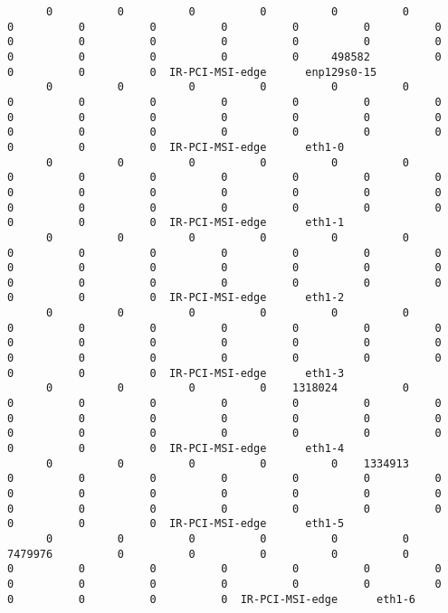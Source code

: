 \begin{lstlisting}
      0          0          0          0          0          0          0          0          0          0          0          0          0          0          0          0          0          0          0          0          0          0          0          0          0     498582          0          0          0          0  IR-PCI-MSI-edge      enp129s0-15
      0          0          0          0          0          0          0          0          0          0          0          0          0          0          0          0          0          0          0          0          0          0          0          0          0          0          0          0          0          0  IR-PCI-MSI-edge      eth1-0
      0          0          0          0          0          0          0          0          0          0          0          0          0          0          0          0          0          0          0          0          0          0          0          0          0          0          0          0          0          0  IR-PCI-MSI-edge      eth1-1
      0          0          0          0          0          0          0          0          0          0          0          0          0          0          0          0          0          0          0          0          0          0          0          0          0          0          0          0          0          0  IR-PCI-MSI-edge      eth1-2
      0          0          0          0          0          0          0          0          0          0          0          0          0          0          0          0          0          0          0          0          0          0          0          0          0          0          0          0          0          0  IR-PCI-MSI-edge      eth1-3
      0          0          0          0    1318024          0          0          0          0          0          0          0          0          0          0          0          0          0          0          0          0          0          0          0          0          0          0          0          0          0  IR-PCI-MSI-edge      eth1-4
      0          0          0          0          0    1334913          0          0          0          0          0          0          0          0          0          0          0          0          0          0          0          0          0          0          0          0          0          0          0          0  IR-PCI-MSI-edge      eth1-5
      0          0          0          0          0          0    7479976          0          0          0          0          0          0          0          0          0          0          0          0          0          0          0          0          0          0          0          0          0          0          0  IR-PCI-MSI-edge      eth1-6

\end{lstlisting}
